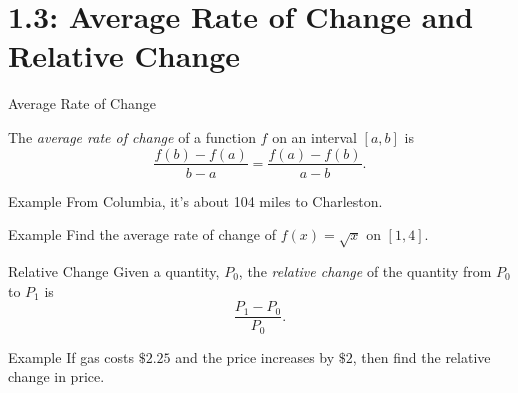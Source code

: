 \documentclass[Lecture.tex]{subfiles}
\begin{document}
\section{1.3: Average Rate of Change and Relative Change}

\begin{frame}{Average Rate of Change}
  \begin{defn}
    The {\it average rate of change} of a function $f$ on an interval $[a,b]$ is
    $$\frac{f(b) - f(a)}{b - a} = \frac{f(a) - f(b)}{a - b}.$$
  \end{defn}
\end{frame}

\begin{frame}{Example}
  From Columbia, it's about 104 miles to Charleston.
  \\

  
\end{frame}

\begin{frame}{Example}
  Find the average rate of change of $f(x) = \sqrt{x}$ on $[1,4]$.

\end{frame}

\begin{frame}{Relative Change}
  Given a quantity, $P_0$, the {\it relative change} of the quantity from $P_0$ to $P_1$ is
  $$\frac{P_1 - P_0}{P_0}.$$
\end{frame}

\begin{frame}{Example}
  If gas costs $\$2.25$ and the price increases by $\$2$, then find the relative change in price.
\end{frame}
\end{document}
